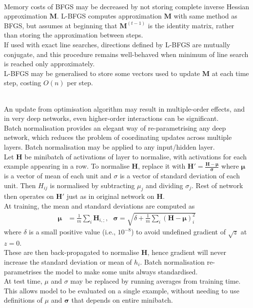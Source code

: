 \begin{remark} \\
Memory costs of BFGS may be decreased by not storing complete inverse Hessian approximation $\bm{M}$. L-BFGS computes approximation $\bm{M}$ with same method as BFGS, but assumes at beginning that $\bm{M}^{(t-1)}$ is the identity matrix, rather than storing the approximation between steps.\\
If used with exact line searches, directions defined by L-BFGS are mutually conjugate, and this procedure remains well-behaved when minimum of line search is reached only approximately.\\
L-BFGS may be generalised to store some vectors used to update $\bm{M}$ at each time step, costing $O(n)$ per step.
\end{remark}

\begin{remark} \\
An update from optimisation algorithm may result in multiple-order effects, and in very deep networks, even higher-order interactions can be significant.\\
Batch normalisation provides an elegant way of re-parametrising any deep network, which reduces the problem of coordinating updates across multiple layers. Batch normalisation may be applied to any input/hidden layer.\\
Let $\bm{H}$ be minibatch of activations of layer to normalise, with activations for each example appearing in a row. To normalise $\bm{H}$, replace it with $\bm{H}' = \frac{\bm{H} - \bm{\mu}}{\bm{\sigma}}$ where $\bm{\mu}$ is a vector of mean of each unit and $\sigma$ is a vector of standard deviation of each unit. Then $H_{ij}$ is normalised by subtracting $\mu_j$ and dividing $\sigma_j$. Rest of network then operates on $\bm{H}'$ just as in original network on $\bm{H}$.\\
At training, the mean and standard deviations are computed as
\begin{align}
\bm{\mu} &= \frac{1}{m} \sum\limits_i \bm{H}_{i, ;}, \ \ \ \bm{\sigma} = \sqrt{\delta + \frac{1}{m} \sum\limits_{i} (\bm{H} - \bm{\mu})^2_i} \nonumber
\end{align}
where $\delta$ is a small positive value (i.e., $10^{-8}$) to avoid undefined gradient of $\sqrt{z}$ at $z=0$.\\
These are then back-propagated to normalise $\bm{H}$, hence gradient will never increase the standard deviation or mean of $h_i$. Batch normalisation re-parametrises the model to make some units always standardised.\\
At test time, $\mu$ and $\sigma$ may be replaced by running averages from training time. This allows model to be evaluated on a single example, without needing to use definitions of $\mu$ and $\bm{\sigma}$ that depends on entire minibatch.
\end{remark}

